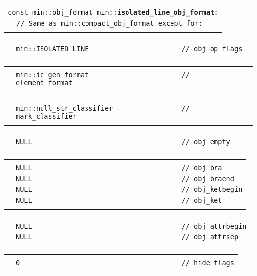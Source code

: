 \documentclass[12pt]{article}
\makeatletter
\newcommand{\TT}[1]{{\tt \bfseries #1}}
\newcommand{\ttindex}[1]{\index{#1@{\tt #1}}}
\newenvironment{indpar}[1][0.3in]%
	{\begin{list}{}%
		     {\setlength{\itemsep}{0in}%
		      \setlength{\topsep}{0in}%
		      \setlength{\parsep}{1ex}%
		      \setlength{\labelwidth}{#1}%
		      \setlength{\leftmargin}{#1}%
		      \addtolength{\leftmargin}{\labelsep}}%
	 \item}%
	{\end{list}}
\newcommand{\LABEL}[1]{\label{#1}}
\newlength{\ARGBREAKLENGTH}
\newcommand{\ARGBREAK}[1][\ARGBREAKLENGTH]{\\&\hspace*{#1}}
\newcommand{\MINKEY}[1]%
	   {\TT{#1}\ttindex{min::#1}\ttindex{#1}}
\makeatother
\begin{document}
\begin{indpar}[1em]

\begin{tabular}{r@{}l}\hspace*{0.1in} \\[-3ex]
\multicolumn{2}{l}{\tt const min::obj\_format
                   min::\MINKEY{isolated\_line\_obj\_format}:}%
\LABEL{MIN::ISOLATED_LINE_OBJ_FORMAT}\ARGBREAK
\verb|// Same as min::compact_obj_format except for:|\ARGBREAK
\end{tabular}

\vspace{-4ex}\begin{tabular}{r@{}l}\hspace*{0.1in}\ARGBREAK
\verb|min::ISOLATED_LINE                       // obj_op_flags|\ARGBREAK
\end{tabular}

\vspace{-4ex}\begin{tabular}{r@{}l}\hspace*{0.1in}\ARGBREAK
\verb|min::id_gen_format                       // element_format|\ARGBREAK
\end{tabular}

\vspace{-4ex}\begin{tabular}{r@{}l}\hspace*{0.1in}\ARGBREAK
\verb|min::null_str_classifier                 // mark_classifier|\ARGBREAK
\end{tabular}

\vspace{-4ex}\begin{tabular}{r@{}l}\hspace*{0.1in}\ARGBREAK
\verb|NULL                                     // obj_empty|\ARGBREAK
\end{tabular}

\vspace{-4ex}\begin{tabular}{r@{}l}\hspace*{0.1in}\ARGBREAK
\verb|NULL                                     // obj_bra|\ARGBREAK
\verb|NULL                                     // obj_braend|\ARGBREAK
\verb|NULL                                     // obj_ketbegin|\ARGBREAK
\verb|NULL                                     // obj_ket|\ARGBREAK
\end{tabular}

\vspace{-4ex}\begin{tabular}{r@{}l}\hspace*{0.1in}\ARGBREAK
\verb|NULL                                     // obj_attrbegin|\ARGBREAK
\verb|NULL                                     // obj_attrsep|\ARGBREAK
\end{tabular}

\vspace{-4ex}\begin{tabular}{r@{}l}\hspace*{0.1in}\ARGBREAK
\verb|0                                        // hide_flags|\ARGBREAK
\end{tabular}


\end{indpar}
\end{document}
